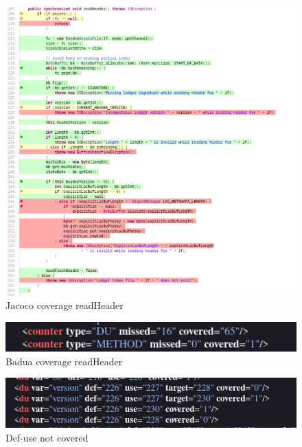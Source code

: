 \documentclass[12pt, a4paper]{article}
\begin{document}
  \begin{figure}
    \includegraphics[width=\linewidth]{./images/file_info/JacocoCoveragereadHeader2.png}
    \caption{Jacoco coverage readHeader}
    \label{fig:JacocoCoveragereadHeader2}
  \end{figure}

  

  \begin{figure}
    \includegraphics[width=\linewidth]{./images/file_info/BaduaCoverageReadHeader1.png}
    \caption{Badua coverage readHeader}
    \label{fig:BaduaCoverageReadHeader1}
  \end{figure}

  \begin{figure}
    \includegraphics[width=\linewidth]{./images/file_info/BaduaCoverageReadHeader2.png}
    \caption{Def-use not covered}
    \label{fig:BaduaCoverageReadHeader2}
  \end{figure}
\end{document}
